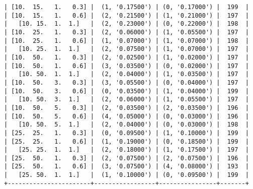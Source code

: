 \documentclass{article}
\begin{document}
\begin{verbatim}
| [10.  15.   1.   0.3] |  (1, '0.17500') | (0, '0.17000') |  199  |
| [10.  15.   1.   0.6] |  (2, '0.21500') | (1, '0.21000') |  197  |
|   [10. 15.  1.  1.]   |  (2, '0.23000') | (0, '0.22000') |  198  |
| [10.  25.   1.   0.3] |  (2, '0.06000') | (1, '0.05500') |  197  |
| [10.  25.   1.   0.6] |  (1, '0.07000') | (1, '0.07000') |  198  |
|   [10. 25.  1.  1.]   |  (2, '0.07500') | (1, '0.07000') |  197  |
| [10.  50.   1.   0.3] |  (2, '0.02500') | (1, '0.02000') |  197  |
| [10.  50.   1.   0.6] |  (3, '0.03500') | (0, '0.02000') |  197  |
|   [10. 50.  1.  1.]   |  (2, '0.04000') | (1, '0.03500') |  197  |
| [10.  50.   3.   0.3] |  (3, '0.05500') | (0, '0.04000') |  197  |
| [10.  50.   3.   0.6] |  (0, '0.03500') | (1, '0.04000') |  199  |
|   [10. 50.  3.  1.]   |  (2, '0.06000') | (1, '0.05500') |  197  |
| [10.  50.   5.   0.3] |  (2, '0.03500') | (2, '0.03500') |  196  |
| [10.  50.   5.   0.6] |  (4, '0.05000') | (0, '0.03000') |  196  |
|   [10. 50.  5.  1.]   |  (2, '0.04000') | (0, '0.03000') |  198  |
| [25.  25.   1.   0.3] |  (0, '0.09500') | (1, '0.10000') |  199  |
| [25.  25.   1.   0.6] |  (1, '0.19000') | (0, '0.18500') |  199  |
|   [25. 25.  1.  1.]   |  (2, '0.18000') | (1, '0.17500') |  197  |
| [25.  50.   1.   0.3] |  (2, '0.07500') | (2, '0.07500') |  196  |
| [25.  50.   1.   0.6] |  (3, '0.07500') | (4, '0.08000') |  193  |
|   [25. 50.  1.  1.]   |  (1, '0.10000') | (0, '0.09500') |  199  |
+-----------------------+-----------------+----------------+-------+
\end{verbatim}
\end{document}
